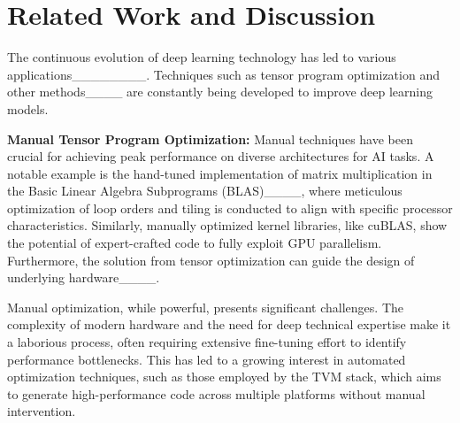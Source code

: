 \section{Related Work and Discussion}
The continuous evolution of deep learning technology has led to various applications________. Techniques such as tensor program optimization and other methods____ are constantly being developed to improve deep learning models.

\textbf{Manual Tensor Program Optimization: }Manual techniques have been crucial for achieving peak performance on diverse architectures for AI tasks. A notable example is the hand-tuned implementation of matrix multiplication in the Basic Linear Algebra Subprograms (BLAS)____, where meticulous optimization of loop orders and tiling is conducted to align with specific processor characteristics. Similarly, manually optimized kernel libraries, like cuBLAS, show the potential of expert-crafted code to fully exploit GPU parallelism. Furthermore, the solution from tensor optimization can guide the design of underlying hardware____.


Manual optimization, while powerful, presents significant challenges. The complexity of modern hardware and the need for deep technical expertise make it a laborious process, often requiring extensive fine-tuning effort to identify performance bottlenecks. This has led to a growing interest in automated optimization techniques, such as those employed by the TVM stack, which aims to generate high-performance code across multiple platforms without manual intervention. 

